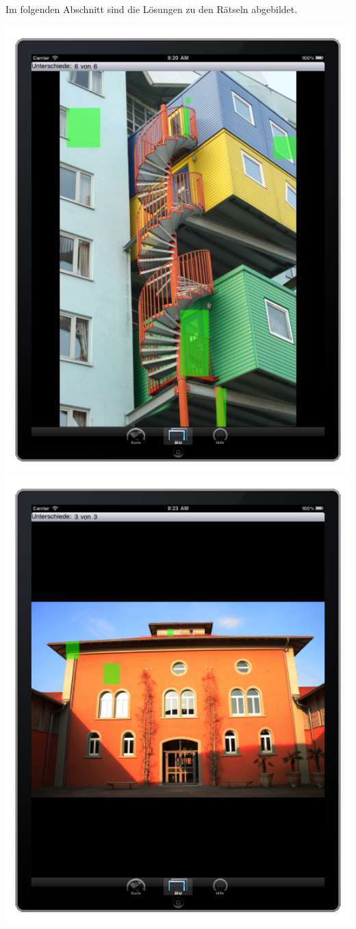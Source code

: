 Im folgenden Abschnitt sind die Lösungen zu den Rätseln abgebildet.


  \includegraphics[width=1.0\textwidth]{bilder/loesung1.png}
  \newpage
  \includegraphics[width=1.0\textwidth]{bilder/loesung2.png}
